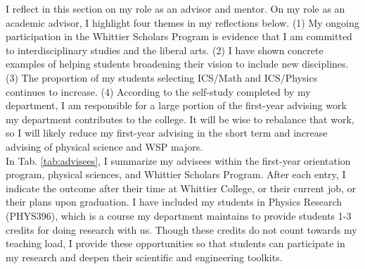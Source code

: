 \documentclass[../../main.tex]{subfiles}
\begin{document}
\label{sec:advising_mentoring}

I reflect in this section on my role as an advisor and mentor.  On my role as an academic advisor, I highlight four themes in my reflections below.  (1) My ongoing participation in the Whittier Scholars Program is evidence that I am committed to interdisciplinary studies and the liberal arts.  (2) I have shown concrete examples of helping students broadening their vision to include new disciplines.  (3) The proportion of my students selecting ICS/Math and ICS/Physics continues to increase.  (4) According to the self-study completed by my department, I am responsible for a large portion of the first-year advising work my department contributes to the college.  It will be wise to rebalance that work, so I will likely reduce my first-year advising in the short term and increase advising of physical science and WSP majors.
\\
\vspace{0.25cm}
In Tab. \ref{tab:advisees}, I summarize my advisees within the first-year orientation program, physical sciences, and Whittier Scholars Program.  After each entry, I indicate the outcome after their time at Whittier College, or their current job, or their plans upon graduation.  I have included my students in Physics Research (PHYS396), which is a course my department maintains to provide students 1-3 credits for doing research with us.  Though these credits do not count towards my teaching load, I provide these opportunities so that students can participate in my research and deepen their scientific and engineering toolkits.
\end{document}
